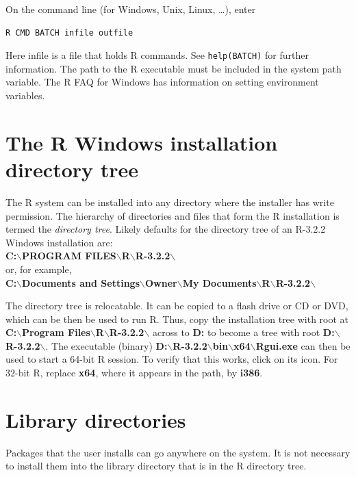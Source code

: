 \documentclass{tufte-book}\usepackage[]{graphicx}\usepackage[]{color}
\newcommand{\txtt}[1]{\texttt{#1}}
\begin{document}
On the command line (for Windows, Unix, Linux, \ldots), enter
\begin{verbatim}
R CMD BATCH infile outfile
\end{verbatim}

Here infile is a file that holds R commands.  See \txtt{help(BATCH)}
for further information. The path to the R executable must be included
in the system path variable. The R FAQ for Windows has information on
setting environment variables.

\section{The R Windows installation directory tree}

The R system can be installed into any directory where the installer
has write permission.  The hierarchy of directories and files that
form the R installation is termed the \textit{directory tree}.  Likely
defaults for the directory tree of an R-3.2.2 Windows installation are:\\
{\small \textbf{C:$\boldsymbol{\backslash}$PROGRAM FILES$\boldsymbol{\backslash}$R$\boldsymbol{\backslash}$R-3.2.2$\boldsymbol{\backslash}$}}\\
\noindent or, for example,\\
{\small \textbf{C:$\boldsymbol{\backslash}$Documents and
  Settings$\boldsymbol{\backslash}$Owner$\boldsymbol{\backslash}$My
  Documents$\boldsymbol{\backslash}$R$\boldsymbol{\backslash}$R-3.2.2$\boldsymbol{\backslash}$}}

The directory tree is relocatable.  It can be copied to a flash drive
or CD or DVD, which can be then be used to run R.
Thus, copy the installation tree with root at
\textbf{C:$\boldsymbol{\backslash}$Program
  Files$\boldsymbol{\backslash}$R$\boldsymbol{\backslash}$R-3.2.2$\boldsymbol{\backslash}$}
across to \textbf{D:} to become a tree with root
\textbf{D:$\boldsymbol{\backslash}$R-3.2.2$\boldsymbol{\backslash}$}.
The executable (binary)
\textbf{D:$\boldsymbol{\backslash}$R-3.2.2$\boldsymbol{\backslash}$bin$\boldsymbol{\backslash}$x64$\boldsymbol{\backslash}$Rgui.exe}
can then be used to start a 64-bit R session. To verify that this works,
click on its icon.
For 32-bit R, replace {\bf x64}, where it appears in the path, by {\bf i386}.

\section{Library directories}
Packages that the user installs can go anywhere on the system.
It is not necessary to install them into the library directory
that is in the R directory tree.
\end{document}
